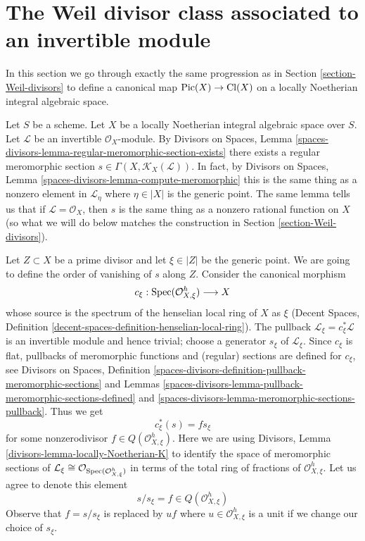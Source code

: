 \section{The Weil divisor class associated to an invertible module}
\label{section-c1}

\noindent
In this section we go through exactly the same progression as in
Section \ref{section-Weil-divisors} to define a canonical map
$\mathop{\mathrm{Pic}}\nolimits(X) \to \text{Cl}(X)$
on a locally Noetherian integral algebraic space.

\medskip\noindent
Let $S$ be a scheme. Let $X$ be a locally Noetherian integral algebraic space
over $S$. Let $\mathcal{L}$ be an invertible $\mathcal{O}_X$-module.
By Divisors on Spaces, Lemma
\ref{spaces-divisors-lemma-regular-meromorphic-section-exists}
there exists a regular meromorphic section
$s \in \Gamma(X, \mathcal{K}_X(\mathcal{L}))$.
In fact, by Divisors on Spaces, Lemma
\ref{spaces-divisors-lemma-compute-meromorphic}
this is the same thing as a nonzero element in
$\mathcal{L}_\eta$ where $\eta \in |X|$ is the generic point.
The same lemma tells us that if $\mathcal{L} = \mathcal{O}_X$,
then $s$ is the same thing as a nonzero rational function on $X$
(so what we will do below matches the construction in
Section \ref{section-Weil-divisors}).

\medskip\noindent
Let $Z \subset X$ be a prime divisor and let $\xi \in |Z|$ be the generic point.
We are going to define the order of vanishing of $s$ along $Z$.
Consider the canonical morphism
$$
c_\xi : \mathop{\mathrm{Spec}}(\mathcal{O}_{X, \xi}^h) \longrightarrow X
$$
whose source is the spectrum of the henselian local ring of $X$ as $\xi$
(Decent Spaces, Definition \ref{decent-spaces-definition-henselian-local-ring}).
The pullback $\mathcal{L}_\xi = c_\xi^*\mathcal{L}$
is an invertible module and hence trivial; choose a generator $s_\xi$ of
$\mathcal{L}_\xi$. Since $c_\xi$ is flat, pullbacks of meromorphic functions
and (regular) sections are defined for $c_\xi$, see
Divisors on Spaces, Definition
\ref{spaces-divisors-definition-pullback-meromorphic-sections} and
Lemmas \ref{spaces-divisors-lemma-pullback-meromorphic-sections-defined} and
\ref{spaces-divisors-lemma-meromorphic-sections-pullback}.
Thus we get
$$
c_\xi^*(s) = f s_\xi
$$
for some nonzerodivisor $f \in Q(\mathcal{O}_{X, \xi}^h)$.
Here we are using Divisors, Lemma \ref{divisors-lemma-locally-Noetherian-K}
to identify the space of meromorphic sections of
$\mathcal{L}_\xi \cong \mathcal{O}_{\mathop{\mathrm{Spec}}(\mathcal{O}_{X, \xi}^h)}$
in terms of the total ring of fractions of $\mathcal{O}_{X, \xi}^h$.
Let us agree to denote this element
$$
s/s_\xi = f \in  Q(\mathcal{O}_{X, \xi}^h)
$$
Observe that $f = s/s_\xi$
is replaced by $uf$ where $u \in \mathcal{O}_{X, \xi}^h$
is a unit if we change our choice of $s_\xi$.

